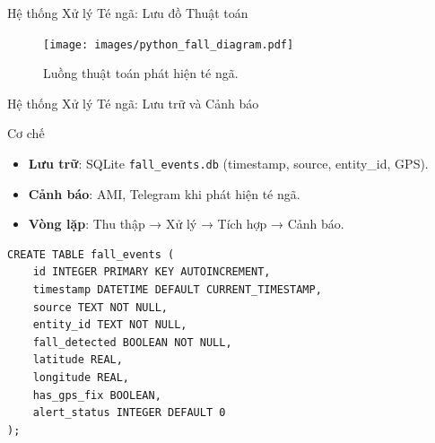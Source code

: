 \begin{frame}[fragile]{Hệ thống Xử lý Té ngã: Lưu đồ Thuật toán}
    \begin{figure}
        \centering
        \texttt{[image: images/python\_fall\_diagram.pdf]}
        \caption{Luồng thuật toán phát hiện té ngã.}
        \label{fig:python_fall_diagram}
    \end{figure}
\end{frame}

\begin{frame}[fragile]{Hệ thống Xử lý Té ngã: Lưu trữ và Cảnh báo}
    \begin{block}{Cơ chế}
        \begin{itemize}
            \item \textbf{Lưu trữ}: SQLite \texttt{fall\_events.db} (timestamp, source, entity\_id, GPS).
            \item \textbf{Cảnh báo}: AMI, Telegram khi phát hiện té ngã.
            \item \textbf{Vòng lặp}: Thu thập → Xử lý → Tích hợp → Cảnh báo.
        \end{itemize}
    \end{block}
    \begin{verbatim}
CREATE TABLE fall_events (
    id INTEGER PRIMARY KEY AUTOINCREMENT,
    timestamp DATETIME DEFAULT CURRENT_TIMESTAMP,
    source TEXT NOT NULL,
    entity_id TEXT NOT NULL,
    fall_detected BOOLEAN NOT NULL,
    latitude REAL,
    longitude REAL,
    has_gps_fix BOOLEAN,
    alert_status INTEGER DEFAULT 0
);
    \end{verbatim}
    \label{subsubsec:data_storage_alerts}
\end{frame}
